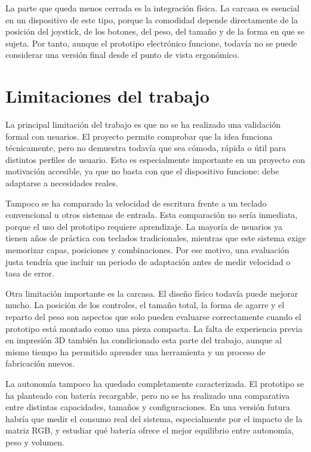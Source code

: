 La parte que queda menos cerrada es la integración física. La carcasa es esencial en un dispositivo de este tipo, porque la comodidad depende directamente de la posición del joystick, de los botones, del peso, del tamaño y de la forma en que se sujeta. Por tanto, aunque el prototipo electrónico funcione, todavía no se puede considerar una versión final desde el punto de vista ergonómico.

\section{Limitaciones del trabajo}
\label{sec:limitaciones-trabajo}

La principal limitación del trabajo es que no se ha realizado una validación formal con usuarios. El proyecto permite comprobar que la idea funciona técnicamente, pero no demuestra todavía que sea cómoda, rápida o útil para distintos perfiles de usuario. Esto es especialmente importante en un proyecto con motivación accesible, ya que no basta con que el dispositivo funcione: debe adaptarse a necesidades reales.

Tampoco se ha comparado la velocidad de escritura frente a un teclado convencional u otros sistemas de entrada. Esta comparación no sería inmediata, porque el uso del prototipo requiere aprendizaje. La mayoría de usuarios ya tienen años de práctica con teclados tradicionales, mientras que este sistema exige memorizar capas, posiciones y combinaciones. Por ese motivo, una evaluación justa tendría que incluir un periodo de adaptación antes de medir velocidad o tasa de error.

Otra limitación importante es la carcasa. El diseño físico todavía puede mejorar mucho. La posición de los controles, el tamaño total, la forma de agarre y el reparto del peso son aspectos que solo pueden evaluarse correctamente cuando el prototipo está montado como una pieza compacta. La falta de experiencia previa en impresión 3D también ha condicionado esta parte del trabajo, aunque al mismo tiempo ha permitido aprender una herramienta y un proceso de fabricación nuevos.

La autonomía tampoco ha quedado completamente caracterizada. El prototipo se ha planteado con batería recargable, pero no se ha realizado una comparativa entre distintas capacidades, tamaños y configuraciones. En una versión futura habría que medir el consumo real del sistema, especialmente por el impacto de la matriz RGB, y estudiar qué batería ofrece el mejor equilibrio entre autonomía, peso y volumen.

